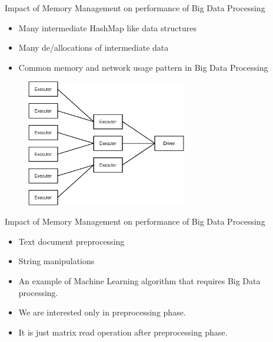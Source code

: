 \documentclass[9pt]{beamer}
\begin{document}
\begin{frame}[fragile]{Impact of Memory Management on performance of Big Data Processing}
\begin{itemize}
    \item Many intermediate HashMap like data structures
    \item Many de/allocations of intermediate data
    \item Common memory and network usage pattern in Big Data Processing
\end{itemize}

\begin{figure}[htb]
    \begin{minipage}[t]{0.5\linewidth}\centering
        \includegraphics[width=7cm]{images/tree_agg.eps} 
    \end{minipage}
\end{figure}

\end{frame}

\begin{frame}[fragile]{Impact of Memory Management on performance of Big Data Processing}
    \begin{itemize}
        \item Text document preprocessing 
        \item String manipulations
        \item An example of Machine Learning algorithm that requires Big Data processing.
        \item We are interested only in preprocessing phase.
        \item It is just matrix read operation after preprocessing phase.
    \end{itemize}    

\end{frame}
\end{document}
